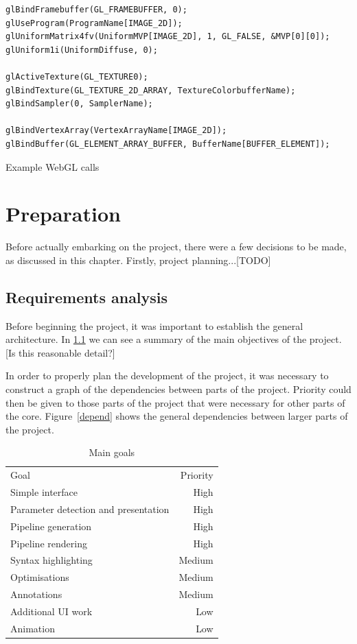 \documentclass[12pt,twoside,notitlepage]{report}
\begin{document}
\begin{listing}[H]
\begin{verbatim}
glBindFramebuffer(GL_FRAMEBUFFER, 0);
glUseProgram(ProgramName[IMAGE_2D]);
glUniformMatrix4fv(UniformMVP[IMAGE_2D], 1, GL_FALSE, &MVP[0][0]);
glUniform1i(UniformDiffuse, 0);

glActiveTexture(GL_TEXTURE0);
glBindTexture(GL_TEXTURE_2D_ARRAY, TextureColorbufferName);
glBindSampler(0, SamplerName);

glBindVertexArray(VertexArrayName[IMAGE_2D]);
glBindBuffer(GL_ELEMENT_ARRAY_BUFFER, BufferName[BUFFER_ELEMENT]);
\end{verbatim}
\caption{Example WebGL calls\label{ugly}}
\end{listing}

\cleardoublepage
\chapter{Preparation}
Before actually embarking on the project, there were a few decisions to be made, as discussed in this chapter. Firstly, project planning...[TODO]

\section{Requirements analysis}
Before beginning the project, it was important to establish the general architecture. In \ref{goals} we can see a summary of the main objectives of the project. [Is this reasonable detail?]

In order to properly plan the development of the project, it was necessary to construct a graph of the dependencies between parts of the project. Priority could then be given to those parts of the project that were necessary for other parts of the core. Figure~\ref{depend} shows the general dependencies between larger parts of the project. 
\begin{table}
\centering
\begin{tabular}{l | r}
Goal & Priority \\
Simple interface & High \\
Parameter detection and presentation & High \\
Pipeline generation & High \\
Pipeline rendering & High \\
Syntax highlighting & Medium \\
Optimisations & Medium \\
Annotations & Medium \\
Additional UI work & Low \\
Animation & Low \\
\end{tabular}
\caption{Main goals\label{goals}}
\end{table}
\end{document}
